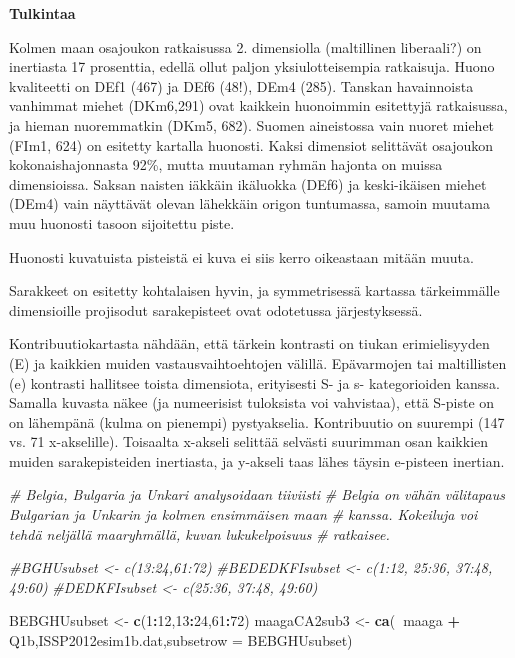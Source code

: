 \documentclass[
  finnish,
]{book}
\newenvironment{Shaded}{\begin{snugshade}}{\end{snugshade}}
\newcommand{\CommentTok}[1]{\textcolor[rgb]{0.56,0.35,0.01}{\textit{#1}}}
\newcommand{\DataTypeTok}[1]{\textcolor[rgb]{0.13,0.29,0.53}{#1}}
\newcommand{\DecValTok}[1]{\textcolor[rgb]{0.00,0.00,0.81}{#1}}
\newcommand{\KeywordTok}[1]{\textcolor[rgb]{0.13,0.29,0.53}{\textbf{#1}}}
\newcommand{\NormalTok}[1]{#1}
\newcommand{\OperatorTok}[1]{\textcolor[rgb]{0.81,0.36,0.00}{\textbf{#1}}}
\newcommand{\StringTok}[1]{\textcolor[rgb]{0.31,0.60,0.02}{#1}}
\begin{document}
\textbf{Tulkintaa}

Kolmen maan osajoukon ratkaisussa 2. dimensiolla (maltillinen liberaali?) on
inertiasta 17 prosenttia, edellä ollut paljon yksiulotteisempia ratkaisuja. Huono kvaliteetti
on DEf1 (467) ja DEf6 (48!), DEm4 (285). Tanskan havainnoista vanhimmat miehet
(DKm6,291) ovat kaikkein huonoimmin esitettyjä ratkaisussa, ja hieman nuoremmatkin
(DKm5, 682). Suomen aineistossa vain nuoret miehet (FIm1, 624) on esitetty kartalla
huonosti. Kaksi dimensiot selittävät osajoukon kokonaishajonnasta 92\%, mutta muutaman
ryhmän hajonta on muissa dimensioissa. Saksan naisten iäkkäin ikäluokka (DEf6)
ja keski-ikäisen miehet (DEm4) vain näyttävät olevan lähekkäin origon tuntumassa,
samoin muutama muu huonosti tasoon sijoitettu piste.

Huonosti kuvatuista pisteistä ei kuva ei siis kerro oikeastaan mitään muuta.

Sarakkeet on esitetty kohtalaisen hyvin, ja symmetrisessä kartassa tärkeimmälle
dimensioille projisodut sarakepisteet ovat odotetussa järjestyksessä.

Kontribuutiokartasta nähdään, että tärkein kontrasti on tiukan erimielisyyden (E)
ja kaikkien muiden vastausvaihtoehtojen välillä. Epävarmojen tai maltillisten (e)
kontrasti hallitsee toista dimensiota, erityisesti S- ja s- kategorioiden kanssa.
Samalla kuvasta näkee (ja numeerisist tuloksista voi vahvistaa), että S-piste on
on lähempänä (kulma on pienempi) pystyakselia. Kontribuutio on suurempi (147 vs.
71 x-akselille). Toisaalta x-akseli selittää selvästi suurimman osan kaikkien muiden
sarakepisteiden inertiasta, ja y-akseli taas lähes täysin e-pisteen inertian.

\begin{Shaded}
\begin{Highlighting}[]
\CommentTok{# Belgia, Bulgaria ja Unkari analysoidaan tiiviisti}
\CommentTok{# Belgia on vähän välitapaus Bulgarian ja Unkarin ja kolmen ensimmäisen maan}
\CommentTok{# kanssa. Kokeiluja voi tehdä neljällä maaryhmällä, kuvan lukukelpoisuus}
\CommentTok{# ratkaisee.}

\CommentTok{#BGHUsubset <- c(13:24,61:72)}
\CommentTok{#BEDEDKFIsubset <- c(1:12, 25:36, 37:48, 49:60)}
\CommentTok{#DEDKFIsubset <- c(25:36, 37:48, 49:60)}

\NormalTok{BEBGHUsubset <-}\StringTok{ }\KeywordTok{c}\NormalTok{(}\DecValTok{1}\OperatorTok{:}\DecValTok{12}\NormalTok{,}\DecValTok{13}\OperatorTok{:}\DecValTok{24}\NormalTok{,}\DecValTok{61}\OperatorTok{:}\DecValTok{72}\NormalTok{)}
\NormalTok{maagaCA2sub3 <-}\StringTok{ }\KeywordTok{ca}\NormalTok{(}\OperatorTok{~}\NormalTok{maaga }\OperatorTok{+}\StringTok{ }\NormalTok{Q1b,ISSP2012esim1b.dat,}\DataTypeTok{subsetrow =}\NormalTok{ BEBGHUsubset)}
\end{Highlighting}
\end{Shaded}
\end{document}

